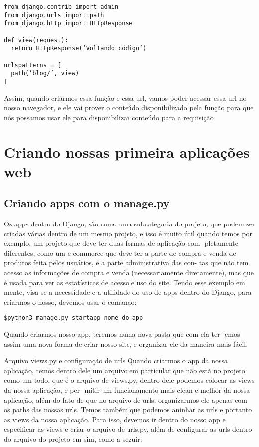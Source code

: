 \documentclass[12pt, a4paper]{paper}
\begin{document}
\begin{verbatim}
from django.contrib import admin
from django.urls import path 
from django.http import HttpResponse

def view(request):
  return HttpResponse(’Voltando código’)

urlspatterns = [
  path(’blog/’, view)
]
\end{verbatim}

Assim, quando criarmos essa função e essa url, vamos poder acessar essa
url no nosso navegador, e ele vai prover o conteúdo disponibilizado pela
função para que nós possamos usar ele para disponibilizar conteúdo para a
requisição

\newpage
\section{Criando nossas primeira aplicações web}%
\label{sec:Criando nossas primeira aplicações web}

\subsection{Criando apps com o manage.py} %
\label{sub:Criando apps com o manage.py}
Os apps dentro do Django, são como uma subcategoria do projeto, que podem
ser criadas várias dentro de um mesmo projeto, e isso é muito útil quando
temos por exemplo, um projeto que deve ter duas formas de aplicação com-
pletamente diferentes, como um e-commerce que deve ter a parte de compra
e venda de produtos feita pelos usuários, e a parte administrativa das con-
tas que não tem acesso as informações de compra e venda (necessariamente
diretamente), mas que é usada para ver as estatísticas de acesso e uso do site.
Tendo esse exemplo em mente, visa-se a necessidade e a utilidade do uso
de apps dentro do Django, para criarmos o nosso, devemos usar o comando:

\begin{verbatim}
$python3 manage.py startapp nome_do_app
\end{verbatim}

Quando criarmos nosso app, teremos numa nova pasta que com ela ter-
emos assim uma nova forma de criar nosso site, e organizar ele da maneira
mais fácil.

Arquivo views.py e configuração de urls
Quando criarmos o app da nossa aplicação, temos dentro dele um arquivo
em particular que não está no projeto como um todo, que é o arquivo de
views.py, dentro dele podemos colocar as views da nossa aplicação, e per-
mitir um funcionamento mais clean e melhor da nossa aplicação, além do
fato de que no arquivo de urls, organizarmos ele apenas com os paths das
nossas urls.
Temos também que podemos aninhar as urls e portanto as views da nossa
aplicação. Para isso, devemos ir dentro do nosso app e especificar as views
e criar o arquivo de urls.py, além de configurar as urls dentro do arquivo
do projeto em sim, como a seguir:
\end{document}
